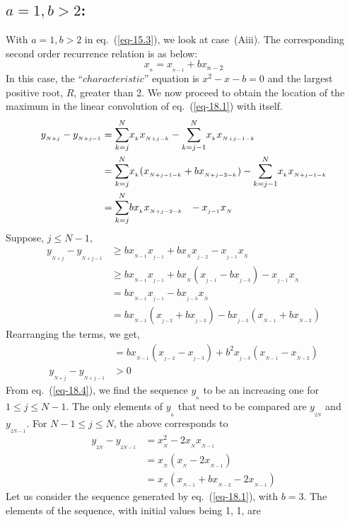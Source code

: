 \begin{multicols}{2}
\section{\underline{$a=1, b > 2$}:}\label{section-18}
With $a=1, b > 2$ in eq.~(\ref{eq-15.3}), we look at case~(Aiii). The corresponding second order recurrence relation is as below:
\begin{equation}
x_{_n} =  x_{_{n-1}} + bx_{{n-2}}\label{eq-18.1}
\end{equation}
In this case, the ``$characteristic$'' equation is $x^2 - x - b = 0$ and the largest positive root, $R$, greater than 2. We now proceed to obtain the location of the maximum in the linear convolution of eq.~(\ref{eq-18.1}) with itself.
{\fontsize{9}{10}\selectfont\begin{align}
y_{_{N+j}} - y_{_{N+j-1}} &= \displaystyle{\sum_{k=j}^{N}}x_{_{k}}x_{_{N+j-k}} -  \displaystyle{\sum_{k=j-1}^{N}}x_{_k}x_{_{N+j-1-k}}\nonumber\\
&= \displaystyle{\sum_{k=j}^{N}}x_{_{k}}(x_{_{N+j-1-k}}+b x_{_{N+j-2-k}}) -  \displaystyle{\sum_{k=j-1}^{N}}x_{_k}x_{_{N+j-1-k}}\nonumber\\
&= \displaystyle{\sum_{k=j}^{N}}bx_{_{k}}x_{_{N+j-2-k}} \hspace{0.1in}- x_{_{j-1}}x_{_N}\label{eq-18.2}
\end{align}}
Suppose, $j \leq N-1$,
\begin{align}
y_{_{N+j}} - y_{_{N+j-1}}&\geq bx_{_{N-1}}x_{_{j-1}} + b x_{_N}x_{_{j-2}} - x_{_{j-1}}x_{_N}\nonumber\\
&\geq bx_{_{N-1}}x_{_{j-1}} + b x_{_N}(x_{_{j-1}}- b x_{_{j-3}})- x_{_{j-1}}x_{_N}\nonumber\\
&= bx_{_{N-1}}x_{_{j-1}} - bx_{_{j-3}}x_{_N}\nonumber\\
&= bx_{_{N-1}}(x_{_{j-2}} + bx_{_{j-3}}) - b x_{_{j-3}}(x_{_{N-1}} + bx_{_{N-2}})\nonumber
\end{align}
Rearranging the terms, we get,
\begin{align}
&= bx_{_{N-1}}(x_{_{j-2}} - x_{_{j-3}}) + b^2x_{_{j-3}}(x_{_{N-1}} - x_{_{N-2}})\label{eq-18.3}\\
y_{_{N+j}} - y_{_{N+j-1}}&> 0\label{eq-18.4}
\end{align}
From eq.~(\ref{eq-18.4}), we find the sequence $y_{_n}$ to be an increasing one for $1 \leq j \leq N-1$. The only elements of $y_{_n}$ that need to be compared are $y_{_{2N}}$ and $y_{_{2N-1}}$.
For\hspace{0.1in} $N-1 \leq j \leq N$,\hspace{0.1in} the above corresponds to
\begin{align}
y_{_{2N}} - y_{_{2N-1}} &= x_{_N}^2 - 2x_{_N}x_{_{N-1}}\label{eq-18.5}\\
&= x_{_N}(x_{_N} - 2x_{_{N-1}})\label{eq-18.6}\\
&= x_{_N}(x_{_{N-1}}+ b x_{_{N-2}}- 2x_{_{N-1}})\label{eq-18.7}
\end{align} 
Let us consider the sequence generated by eq.~(\ref{eq-18.1}), with $b=3$. The elements of the sequence, with initial values being 1, 1, are


\end{multicols}
